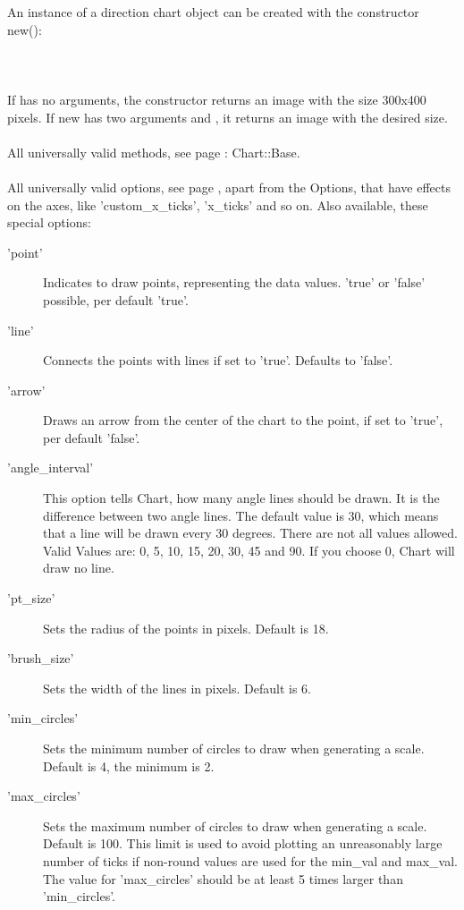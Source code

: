 An instance of a direction chart object can be created with the constructor new():\\
\\
\\
\\
If  has no arguments, the constructor returns an image with the size 300x400 pixels. If new has two arguments  and , it returns an image with the desired size. \\ 
\\ 
All universally valid methods, see page \pageref{methods}: Chart::Base. \\
\\
 All universally valid options, see page \pageref{options}, apart from the Options, that have effects on the axes, like 'custom\_x\_ticks', 'x\_ticks' and so on. Also available, these special options:
\begin{description}
\item['point'] Indicates to draw points, representing the data values. 'true' or 'false' possible, per default 'true'.
\item['line'] Connects the points with lines if set to 'true'. Defaults to 'false'.
\item['arrow'] Draws an arrow from the center of the chart to the point, if set to 'true', per default 'false'.
\item['angle\_interval'] This option tells Chart, how many angle lines should be drawn. It is the difference between two angle lines. The default value is 30, which means that a line will be drawn every 30 degrees. There are not all values allowed. Valid Values are: 0, 5, 10, 15, 20, 30, 45 and 90. If you choose 0, Chart will draw no line.  
\item['pt\_size']Sets the radius of the points in pixels. Default is 18.
\item['brush\_size']Sets the width of the lines in pixels. Default is 6.
\item['min\_circles'] Sets the minimum number of circles to draw when generating a scale. Default is 4, the minimum is 2.
\item['max\_circles']Sets the maximum number of circles to draw when generating a scale. Default is 100. This limit is used to avoid plotting an unreasonably large number of ticks if non-round values are used for the min\_val and max\_val.\\
The value for 'max\_circles' should be at least 5 times larger than 'min\_circles'.
\end{description}